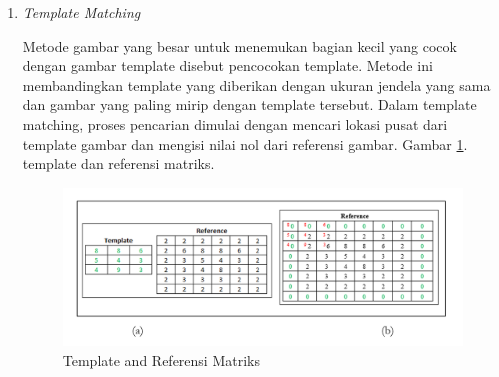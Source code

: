 \begin{enumerate}
	\item \textit{Template Matching}
	
	Metode gambar yang besar untuk menemukan bagian kecil yang cocok dengan gambar template disebut pencocokan template. Metode ini membandingkan template yang diberikan dengan ukuran jendela yang sama dan gambar yang paling mirip dengan template tersebut. Dalam template matching, proses pencarian dimulai dengan mencari lokasi pusat dari template gambar dan mengisi nilai nol dari referensi gambar. Gambar \ref{img:Template-Referensi-Matriks}. template dan referensi matriks. 
	
	\begin{figure}[H]
		\vspace{-0.1cm}
		\begin{center}
			\includegraphics[width=1\columnwidth]{bab3/Gambar/Picture12.png}
		\end{center}
		\vspace{-0.2cm}
		\captionsetup{justification=centering}
		\caption{Template and Referensi Matriks}\label{img:Template-Referensi-Matriks}
	\end{figure}
	

\end{enumerate}
